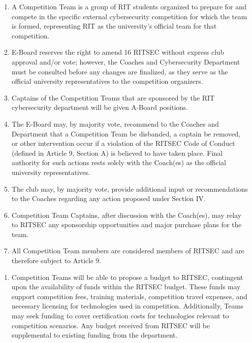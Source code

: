 

\begin{enumerate}
	\item A Competition Team is a group of RIT students organized to prepare for and compete 
            in the specific external cybersecurity competition for which the team is formed, 
            representing RIT as the university’s official team for that competition.
	\item E-Board reserves the right to amend 16 RITSEC without express club approval and/or 
            vote; however, the Coaches and Cybersecurity Department must be consulted before any 
            changes are finalized, as they serve as the official university representatives to the 
            competition organizers.
      \item Captains of the Competition Teams that are sponsored by the RIT cybersecurity department 
            will be given A-Board positions.
      \item The E-Board may, by majority vote, recommend to the Coaches and Department that a 
            Competition Team be disbanded, a captain be removed, or other intervention occur if a 
            violation of the RITSEC Code of Conduct (defined in Article 9, Section A) is believed 
            to have taken place. Final authority for such actions rests solely with the Coach(es) 
            as the official university representatives.
      \item The club may, by majority vote, provide additional input or recommendations to the Coaches 
            regarding any action proposed under Section IV.
      \item Competition Team Captains, after discussion with the Coach(es), may relay to RITSEC any 
            sponsorship opportunities and major purchase plans for the team.
      \item All Competition Team members are considered members of RITSEC and are therefore subject 
            to Article 9.

\end{enumerate}


\begin{enumerate}
	\item Competition Teams will be able to propose a budget to RITSEC, contingent upon the availability of funds within the RITSEC budget. These funds may support competition fees, training materials, competition travel expenses, and necessary licensing for technologies used in competition. Additionally, Teams may seek funding to cover certification costs for technologies relevant to competition scenarios. Any budget received from RITSEC will be supplemental to existing funding from the department.
\end{enumerate}



